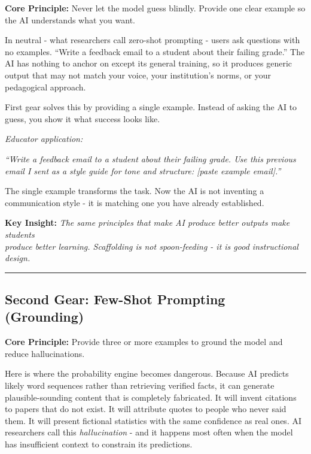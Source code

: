 \documentclass[
  letterpaper,
  DIV=11,
  numbers=noendperiod]{scrreprt}
\begin{document}
\textbf{Core Principle:} Never let the model guess blindly. Provide one
clear example so the AI understands what you want.

In neutral - what researchers call zero-shot prompting - users ask
questions with no examples. ``Write a feedback email to a student about
their failing grade.'' The AI has nothing to anchor on except its
general training, so it produces generic output that may not match your
voice, your institution's norms, or your pedagogical approach.

First gear solves this by providing a single example. Instead of asking
the AI to guess, you show it what success looks like.

\emph{Educator application:}

\emph{``Write a feedback email to a student about their failing grade.
Use this previous email I sent as a style guide for tone and structure:
{[}paste example email{]}.''}

The single example transforms the task. Now the AI is not inventing a
communication style - it is matching one you have already established.

\textbf{Key Insight:} \emph{The same principles that make AI produce
better outputs make students}\\
\emph{produce better learning. Scaffolding is not spoon-feeding - it is
good instructional design.}

\begin{center}\rule{0.5\linewidth}{0.5pt}\end{center}

\subsection{Second Gear: Few-Shot Prompting
(Grounding)}\label{second-gear-few-shot-prompting-grounding}

\textbf{Core Principle:} Provide three or more examples to ground the
model and reduce hallucinations.

Here is where the probability engine becomes dangerous. Because AI
predicts likely word sequences rather than retrieving verified facts, it
can generate plausible-sounding content that is completely fabricated.
It will invent citations to papers that do not exist. It will attribute
quotes to people who never said them. It will present fictional
statistics with the same confidence as real ones. AI researchers call
this \emph{hallucination} - and it happens most often when the model has
insufficient context to constrain its predictions.
\end{document}
